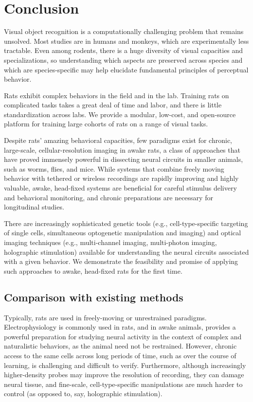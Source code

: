 \chapter{Conclusion}
\label{conclusion}

Visual object recognition is a computationally challenging problem that remains unsolved. Most studies are in humans and monkeys, which are experimentally less tractable. Even among rodents, there is a huge diversity of visual capacities and specializations, so understanding which aspects are preserved across species and which are species-specific may help elucidate fundamental principles of perceptual behavior. 

Rats exhibit complex behaviors in the field and in the lab. Training rats on complicated tasks takes a great deal of time and labor, and there is little standardization across labs. We provide a modular, low-cost, and open-source platform for training large cohorts of rats on a range of visual tasks.

Despite rats’ amazing behavioral capacities, few paradigms exist for chronic, large-scale, cellular-resolution imaging in awake rats, a class of approaches that have proved immensely powerful in dissecting neural circuits in smaller animals, such as worms, flies, and mice. While systems that combine freely moving behavior with tethered or wireless recordings are rapidly improving and highly valuable, awake, head-fixed systems are beneficial for careful stimulus delivery and behavioral monitoring, and chronic preparations are necessary for longitudinal studies.   

There are increasingly sophisticated genetic tools (e.g., cell-type-specific targeting of single cells, simultaneous optogenetic manipulation and imaging) and optical imaging techniques (e.g., multi-channel imaging, multi-photon imaging, holographic stimulation) available for understanding the neural circuits associated with a given behavior. We demonstrate the feasibility and promise of applying such approaches to awake, head-fixed rats for the first time. 

\section{Comparison with existing methods}
Typically, rats are used in freely-moving or unrestrained paradigms. Electrophysiology is commonly used in rats, and in awake animals, provides a powerful preparation for studying neural activity in the context of complex and naturalistic behaviors, as the animal need not be restrained. However, chronic access to the same cells across long periods of time, such as over the course of learning, is challenging and difficult to verify. Furthermore, although increasingly higher-density probes may improve the resolution of recording, they can damage neural tissue, and fine-scale, cell-type-specific manipulations are much harder to control (as opposed to, say, holographic stimulation).  

